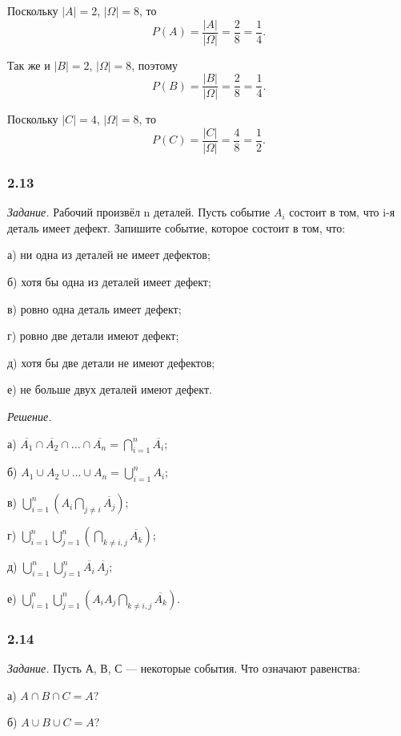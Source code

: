\documentclass{book}
\begin{document}
Поскольку $|A|=2$, $|\Omega|=8$, то $$P(A)=\frac{|A|}{|\Omega|}=\frac{2}{8}=\frac{1}{4}.$$

Так же и $|B|=2$, $|\Omega|=8$, поэтому $$P(B)=\frac{|B|}{|\Omega|}=\frac{2}{8}=\frac{1}{4}.$$

Поскольку $|C|=4$, $|\Omega|=8$, то $$P(C)=\frac{|C|}{|\Omega|}=\frac{4}{8}=\frac{1}{2}.$$

\subsubsection*{2.13}

\textit{Задание.} Рабочий произвёл n деталей. Пусть событие $A_i$ состоит в том, что i-я деталь имеет дефект. Запишите событие, которое состоит в том, что:

а) ни одна из деталей не имеет дефектов;

б) хотя бы одна из деталей имеет дефект;

в) ровно одна деталь имеет дефект;

г) ровно две детали имеют дефект;

д) хотя бы две детали не имеют дефектов;

е) не больше двух деталей имеют дефект.

\textit{Решение.}

а) $\overline{A_1}\cap\overline{A_2}\cap...\cap\overline{A_n}=\bigcap\limits_{i=1}^n\overline{A_i}$;

б) $A_1\cup A_2\cup...\cup A_n=\bigcup\limits_{i=1}^nA_i$;

в) $\bigcup\limits_{i=1}^n\left(A_i\bigcap\limits_{j\neq i}\overline{A_j}\right)$;

г) $\bigcup\limits_{i=1}^n\bigcup\limits_{j=1}^n\left(\bigcap\limits_{k\neq i, j}\overline{A_k}\right)$;

д) $\bigcup\limits_{i=1}^n\bigcup\limits_{j=1}^n\overline{A_i}\,\overline{A_j}$;

е) $\bigcup\limits_{i=1}^n\bigcup\limits_{j=1}^n\left(A_iA_j\bigcap\limits_{k\neq i, j}\overline{A_k}\right)$.

\subsubsection*{2.14}

\textit{Задание.} Пусть А, В, С --- некоторые события. Что означают равенства:

а) $A\cap B\cap C=A$?

б) $A\cup B\cup C=A$?
\end{document}
